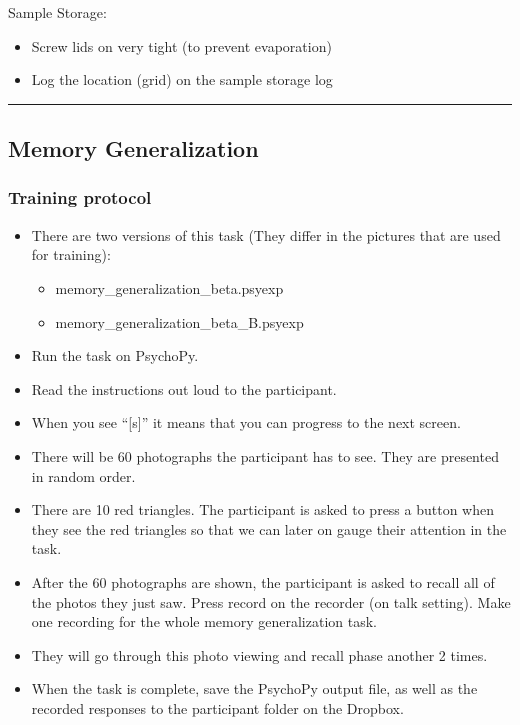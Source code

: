 \documentclass[]{book}
\providecommand{\tightlist}{%
  \setlength{\itemsep}{0pt}\setlength{\parskip}{0pt}}
\begin{document}
Sample Storage:

\begin{itemize}
\tightlist
\item
  Screw lids on very tight (to prevent evaporation)
\item
  Log the location (grid) on the sample storage log
\end{itemize}

\begin{center}\rule{0.5\linewidth}{0.5pt}\end{center}

\hypertarget{memory-generalization}{%
\subsection{Memory Generalization}\label{memory-generalization}}

\hypertarget{training-protocol}{%
\subsubsection{Training protocol}\label{training-protocol}}

\begin{itemize}
\tightlist
\item
  There are two versions of this task (They differ in the pictures that are used for training):

  \begin{itemize}
  \tightlist
  \item
    memory\_generalization\_beta.psyexp
  \item
    memory\_generalization\_beta\_B.psyexp
  \end{itemize}
\item
  Run the task on PsychoPy.
\item
  Read the instructions out loud to the participant.
\item
  When you see ``{[}s{]}'' it means that you can progress to the next screen.
\item
  There will be 60 photographs the participant has to see. They are presented in random order.
\item
  There are 10 red triangles. The participant is asked to press a button when they see the red triangles so that we can later on gauge their attention in the task.
\item
  After the 60 photographs are shown, the participant is asked to recall all of the photos they just saw. Press record on the recorder (on talk setting). Make one recording for the whole memory generalization task.
\item
  They will go through this photo viewing and recall phase another 2 times.
\item
  When the task is complete, save the PsychoPy output file, as well as the recorded responses to the participant folder on the Dropbox.
\end{itemize}
\end{document}

